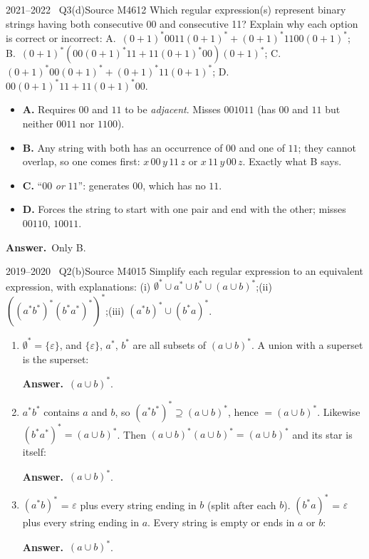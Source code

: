 \documentclass[11pt,a4paper]{article}
\newcommand{\eps}{\varepsilon}
\newcommand{\ok}{\textcolor{teal}{\ensuremath{\checkmark}}}
\newcommand{\no}{\textcolor{coral}{\ensuremath{\times}}}
\newcommand{\ans}[1]{\par\smallskip\noindent\colorbox{mist}{\parbox{\dimexpr\linewidth-2\fboxsep}{\sffamily\small\textbf{\color{teal}Answer.}\ \color{ink}#1}}\par}
\begin{document}
\begin{question}{2021--2022 \textbullet\ Q3(d)}{Source M46}{12}
Which regular expression(s) represent binary strings having both consecutive 00 and consecutive 11? Explain why each option is correct or incorrect:
A.\ $(0+1)^*0011(0+1)^*+(0+1)^*1100(0+1)^*$;\quad
B.\ $(0+1)^*(00(0+1)^*11+11(0+1)^*00)(0+1)^*$;\quad
C.\ $(0+1)^*00(0+1)^*+(0+1)^*11(0+1)^*$;\quad
D.\ $00(0+1)^*11+11(0+1)^*00$.
\end{question}
\begin{solution}
\begin{itemize}
\item[\no] \textbf{A.} Requires $00$ and $11$ to be \emph{adjacent}. Misses $001011$ (has $00$ and $11$ but neither $0011$ nor $1100$).
\item[\ok] \textbf{B.} Any string with both has an occurrence of $00$ and one of $11$; they cannot overlap, so one comes first: $x\,00\,y\,11\,z$ or $x\,11\,y\,00\,z$. Exactly what B says.
\item[\no] \textbf{C.} ``$00$ \emph{or} $11$'': generates $00$, which has no $11$.
\item[\no] \textbf{D.} Forces the string to start with one pair and end with the other; misses $00110$, $10011$.
\end{itemize}
\ans{Only B.}
\end{solution}

\begin{question}{2019--2020 \textbullet\ Q2(b)}{Source M40}{15}
Simplify each regular expression to an equivalent expression, with explanations:
(i) $\emptyset^*\cup a^*\cup b^*\cup(a\cup b)^*$;\quad (ii) $((a^*b^*)^*(b^*a^*)^*)^*$;\quad (iii) $(a^*b)^*\cup(b^*a)^*$.
\end{question}
\begin{solution}
\begin{enumerate}
\item $\emptyset^*=\{\eps\}$, and $\{\eps\}$, $a^*$, $b^*$ are all subsets of $(a\cup b)^*$. A union with a superset is the superset: \ans{$(a\cup b)^*$.}
\item $a^*b^*$ contains $a$ and $b$, so $(a^*b^*)^*\supseteq(a\cup b)^*$, hence $=(a\cup b)^*$. Likewise $(b^*a^*)^*=(a\cup b)^*$. Then $(a\cup b)^*(a\cup b)^*=(a\cup b)^*$ and its star is itself: \ans{$(a\cup b)^*$.}
\item $(a^*b)^*$ = $\eps$ plus every string ending in $b$ (split after each $b$). $(b^*a)^*$ = $\eps$ plus every string ending in $a$. Every string is empty or ends in $a$ or $b$: \ans{$(a\cup b)^*$.}
\end{enumerate}
\end{solution}
\end{document}
